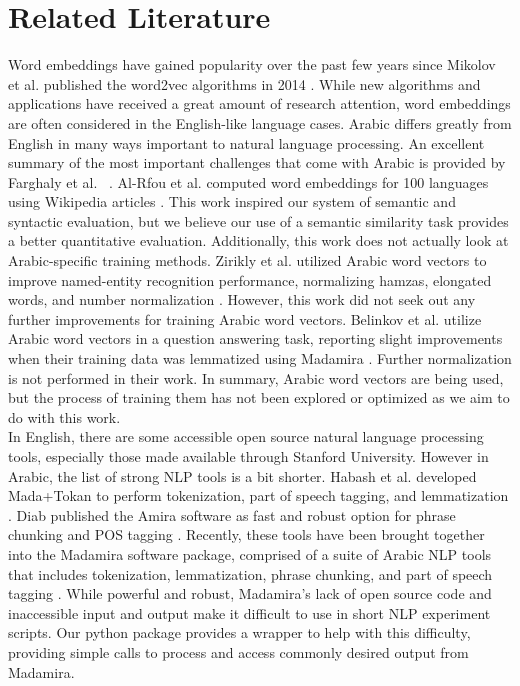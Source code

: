 \section{Related Literature}
\label{sec:literature}

Word embeddings have gained popularity over the past few years since Mikolov et al. published the word2vec algorithms in 2014 \cite{mikolovdist:2013, mikoloveffic:2013}. While new algorithms and applications have received a great amount of research attention, word embeddings are often considered in the English-like language cases. Arabic differs greatly from English in many ways important to natural language processing. An excellent summary of the most important challenges that come with Arabic is provided by Farghaly et al. ~\cite{farghaly:2009}. Al-Rfou et al. computed word embeddings for 100 languages using Wikipedia articles \cite{al:2013}. This work inspired our system of semantic and syntactic evaluation, but we believe our use of a semantic similarity task provides a better quantitative evaluation. Additionally, this work does not actually look at Arabic-specific training methods. Zirikly et al. utilized Arabic word vectors to improve named-entity recognition performance, normalizing hamzas, elongated words, and number normalization \cite{zirikly:2015}. However, this work did not seek out any further improvements for training Arabic word vectors. Belinkov et al. utilize Arabic word vectors in a question answering task, reporting slight improvements when their training data was lemmatized using Madamira \cite{belinkov:2015}. Further normalization is not performed in their work. In summary, Arabic word vectors are being used, but the process of training them has not been explored or optimized as we aim to do with this work.
\\
In English, there are some accessible open source natural language processing tools, especially those made available through Stanford University. However in Arabic, the list of strong NLP tools is a bit shorter. Habash et al. developed Mada+Tokan to perform tokenization, part of speech tagging, and lemmatization \cite{habash:2009}. Diab published the Amira software as fast and robust option for phrase chunking and POS tagging \cite{diab:2009}. Recently, these tools have been brought together into the Madamira software package, comprised of a suite of Arabic NLP tools that includes tokenization, lemmatization, phrase chunking, and part of speech tagging \cite{pasha:2014}. While powerful and robust, Madamira's lack of open source code and inaccessible input and output make it difficult to use in short NLP experiment scripts. Our python package provides a wrapper to help with this difficulty, providing simple calls to process and access commonly desired output from Madamira.
